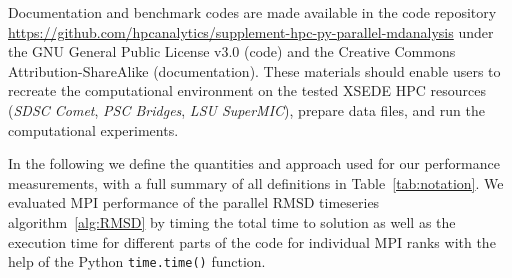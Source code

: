 \label{sec:methods}

Documentation and benchmark codes are made available in the code repository \url{https://github.com/hpcanalytics/supplement-hpc-py-parallel-mdanalysis} under the GNU General Public License v3.0 (code) and the Creative Commons Attribution-ShareAlike (documentation). 
These materials should enable users to recreate the computational environment on the tested XSEDE HPC resources (\emph{SDSC Comet}, \emph{PSC Bridges}, \emph{LSU SuperMIC}), prepare data files, and run the computational experiments.

In the following we define the quantities and approach used for our performance measurements, with a full summary of all definitions in Table~\ref{tab:notation}.
We evaluated MPI performance of the parallel RMSD timeseries algorithm~\ref{alg:RMSD} by timing the total time to solution as well as the execution time for different parts of the code for individual MPI ranks with the help of the Python \texttt{time.time()} function.


